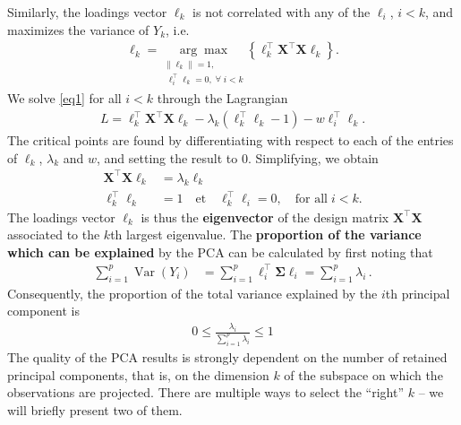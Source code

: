 Similarly, the loadings vector $\ell_k$ is not correlated with any of the $\ell_i$, $i<k$, and maximizes the variance of $Y_k$, i.e.
\begin{align}
\mathbf{\ell}_k=\underset{\substack{\|\ell_k\|=1,\\ \;\ell_{i}^{\!\top}\ell_k=0,\;\forall\;i<k}}{\arg \max} \left\{\ell^{\!\top}_k\mathbf{X}^{\!\top} \mathbf{X} \ell_k\right\}.\label{eq1}
\end{align}
We solve \eqref{eq1} for all  $i<k$ through the Lagrangian
\begin{align*}
L=\ell^{\!\top}_k\mathbf{X}^{\!\top} \mathbf{X} \ell_k-\lambda_k(\ell^{\!\top}_k\ell_k-1)-w\ell_{i}^{\!\top}\ell_k.
\end{align*}
The critical points are found by differentiating with respect to each of the entries of $\ell_k$, $\lambda_k$ and $w$, and setting the result to 0. Simplifying, we obtain  
\begin{align*}
\mathbf{X}^{\!\top} \mathbf{X} \ell_k&=\lambda_k\ell_k\\
\ell^{\!\top}_k\ell_k&=1 \quad\text{et}\quad\ell^{\!\top}_k\ell_i=0,\quad\text{for all}\; i<k.
\end{align*}
The loadings vector $\ell_k$ is thus the \textbf{eigenvector} of the design matrix $\mathbf{X}^{\!\top} \mathbf{X}$ associated to the $k$th largest eigenvalue. \newl
The \textbf{proportion of the variance which can be explained} by the PCA can be calculated by first noting that 
\begin{align*}
\sum_{i=1}^{p}\operatorname{Var}\left(Y_{i}\right) &=\sum_{i=1}^{p}\ell_{i}^{\!\top} \boldsymbol{\Sigma} \ell_{i}=\sum_{i=1}^{p}\lambda_i \,.
\end{align*}
Consequently, the proportion of the total variance explained by the $i$th principal component is  
\begin{align*}
0\leq \frac{\lambda_i}{\sum_{i=1}^{p}\lambda_i }\leq 1
\end{align*}
The quality of the PCA results is strongly dependent on the number of retained principal components, that is, on the dimension $k$ of the subspace on which the observations are projected. There are multiple ways to select the ``right'' $k$ -- we will briefly present two of them. 
